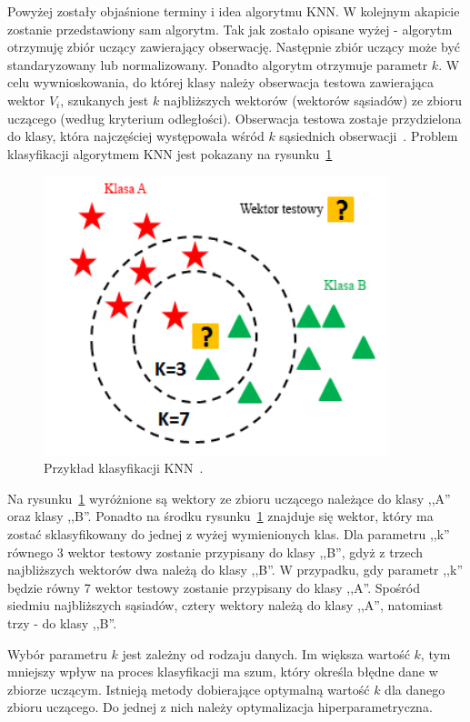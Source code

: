 \documentclass[a4paper,twoside,12pt]{book}
\begin{document}
    Powyżej zostały objaśnione terminy i idea algorytmu KNN. W kolejnym akapicie zostanie przedstawiony sam algorytm.
    Tak jak zostało opisane wyżej - algorytm otrzymuję zbiór uczący zawierający obserwację. Następnie zbiór uczący
    może być standaryzowany lub normalizowany. Ponadto algorytm otrzymuje parametr $k$.
    W celu wywnioskowania, do której klasy należy obserwacja testowa zawierająca wektor $V_{i}$, szukanych jest $k$
    najbliższych wektorów (wektorów sąsiadów) ze zbioru uczącego (według kryterium odległości). Obserwacja testowa
    zostaje przydzielona do klasy, która najczęściej występowała wśród $k$ sąsiednich obserwacji~\cite{knnOpis}.
    Problem klasyfikacji algorytmem KNN jest pokazany na rysunku~\ref{fig.klasyfikacjaKNN}
    \begin{figure}
        \centering
        \includegraphics[width=10cm]{Obrazy/klasyfikacjaKNN.jpg}
        \caption{Przykład klasyfikacji KNN~\cite{KNNObraz}.}
        \label{fig.klasyfikacjaKNN}
    \end{figure}

    Na rysunku~\ref{fig.klasyfikacjaKNN} wyróżnione są wektory ze zbioru uczącego należące do klasy ,,A'' oraz klasy
    ,,B''. Ponadto na środku rysunku~\ref{fig.klasyfikacjaKNN} znajduje się wektor, który ma zostać
    sklasyfikowany do jednej z wyżej wymienionych klas.
    Dla parametru ,,k'' równego 3 wektor testowy zostanie przypisany do klasy ,,B'', gdyż z trzech najbliższych wektorów dwa
    należą do klasy ,,B''. W przypadku, gdy parametr ,,k'' będzie równy 7 wektor testowy zostanie przypisany do klasy
    ,,A''. Spośród siedmiu najbliższych sąsiadów, cztery wektory należą do klasy ,,A'', natomiast trzy - do klasy ,,B''.

    Wybór parametru $k$ jest zależny od rodzaju danych. Im większa wartość $k$, tym mniejszy wpływ na proces
    klasyfikacji ma szum, który określa błędne dane w zbiorze uczącym. Istnieją metody dobierające optymalną wartość $k$ dla
    danego zbioru uczącego. Do jednej z nich należy optymalizacja hiperparametryczna.
\end{document}
